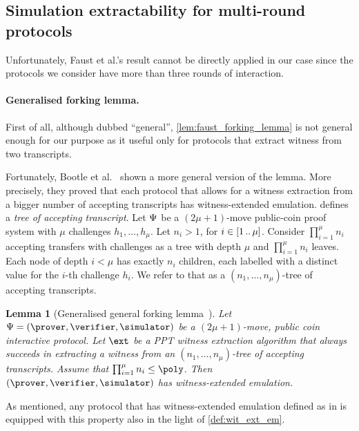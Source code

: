 \documentclass[runningheads,11pt]{llncs}
\newtheorem{lemma}[theorem]{Lemma}
\theoremstyle{definition}
\begin{document}


%
\subsection{Simulation extractability for multi-round protocols}
Unfortunately, Faust et al.'s result cannot be directly applied in our case since the protocols we consider have more than three rounds of interaction.

\paragraph{Generalised forking lemma.}
First of all, although dubbed ``general'', \cref{lem:faust_forking_lemma} is not general enough for our purpose as it useful only for protocols that extract witness from two transcripts.

Fortunately, Bootle et al.~\cite{EC:BCCGP16} shown a more general version of the lemma. More precisely, they proved that each protocol that allows for a witness extraction from a bigger number of accepting transcripts has witness-extended emulation. \cite{EC:BCCGP16} defines a \emph{tree of accepting transcript}.
Let $\mathrm{\Psi}$ be a $(2 \mu + 1)$-move public-coin proof system with $\mu$ challenges $h_1, \ldots, h_\mu$. Let $n_i > 1$, for $i \in [1 \, .. \, \mu]$.
Consider $\prod_{i = 1}^{\mu} n_i$ accepting transfers with challenges as a tree with depth $\mu$ and $\prod_{i = 1}^{\mu} n_i$ leaves.	Each node of depth $i < \mu$ has exactly $n_i$ children, each labelled with a distinct value for the $i$-th challenge $h_i$. We refer to that as a $(n_1, \ldots, n_\mu)$-tree of accepting transcripts.

\begin{lemma}[Generalised general forking lemma~\cite{EC:BCCGP16}]
	\label{lem:bootle_forking_lemma}
	Let $\proofsystem = (\prover, \verifier, \simulator)$ be a $(2\mu + 1)$-move, public coin interactive  protocol. Let $\ext$ be a PPT witness extraction algorithm that always succeeds in extracting a witness from an $(n_1, \ldots, n_\mu)$-tree of accepting transcripts. Assume that $\prod_{i = 1}^{\mu} n_i \leq \poly$.
	Then $(\prover, \verifier, \simulator)$ has witness-extended emulation.
\end{lemma}
As mentioned, any protocol that has witness-extended emulation defined as in \cite{EC:BCCGP16} is equipped with this property also in the light of \cref{def:wit_ext_em}.
\end{document}
